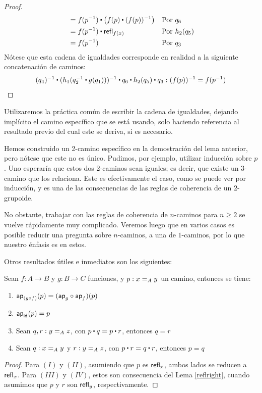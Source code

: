 \documentclass[../main.tex]{subfiles}
\begin{document}
\begin{proof}
\begin{align*}
                                            & = f(p^{-1}) \ct \left( f(p) \ct (f(p))^{-1}\right) &                       & \text{Por $q_6$}                             \\
                                            & = f(p^{-1}) \ct\refl{f(x)}                         &                       & \text{Por $h_2(q_5)$}                        \\
                                            & = f(p^{-1})                                        &                       & \text{Por $q_3$}
  \end{align*}
  Nótese que esta cadena de igualdades corresponde en realidad a la siguiente concatenación de caminos:
  \[ (q_4)^{-1} \ct (h_1(q_2^{-1} \ct g(q_1)))^{-1} \ct q_6 \ct h_2(q_5) \ct q_3 : (f(p))^{-1}=f(p^{-1}) \]
\end{proof}

Utilizaremos la práctica común de escribir la cadena de igualdades, dejando implícito el camino específico que se est\'a usando, solo haciendo referencia al resultado previo del cual este se deriva, si es necesario.

Hemos construido un 2-camino espec\'ifico en la demostración del lema anterior, pero n\'otese que este no es \'unico.
Pudimos, por ejemplo, utilizar inducción sobre $p$.
Uno esperar\'ia que estos dos 2-caminos sean iguales; es decir, que existe un 3-camino que los relaciona.
Este es efectivamente el caso, como se puede ver por inducción, y es una de las consecuencias de las reglas de coherencia de un $2$-grupoide.

No obstante, trabajar con las reglas de coherencia de $n$-caminos para $n \geq 2$ se vuelve r\'apidamente muy complicado.
Veremos luego que en varios casos es posible reducir una pregunta sobre $n$-caminos, a una de $1$-caminos, por lo que nuestro \'enfasis es en estos.

Otros resultados útiles e inmediatos son los siguientes:

\begin{lemma}
  Sean $f:A \to B$ y $g:B \to C$ funciones, y $p:\id[A]{x}{y}$ un camino, entonces se tiene:
  \begin{enumerate}
    \item $\apfunc{(g \circ f)}(p) = (\apfunc g \circ \apfunc f)(p)$
    \item $\apfunc \idfunc (p) = p$
    \item Sean $q,r: \id[A]{y}{z}$, con $p \ct q = p \ct r$, entonces $q = r$
    \item Sean $q: \id[A]{x}{y}$ y $r:\id[A]{y}{z}$, con $p \ct r = q \ct r$, entonces $p = q$
  \end{enumerate}
\end{lemma}
\begin{proof}
  Para $(I)$ y $(II)$, asumiendo que $p$ es $\refl{x}$, ambos lados se reducen a $\refl{x}$.
  Para $(III)$ y $(IV)$, estos son consecuencia del Lema \ref{reflright}, cuando asumimos que $p$ y $r$ son $\refl{y}$, respectivamente.
\end{proof}
\end{document}
